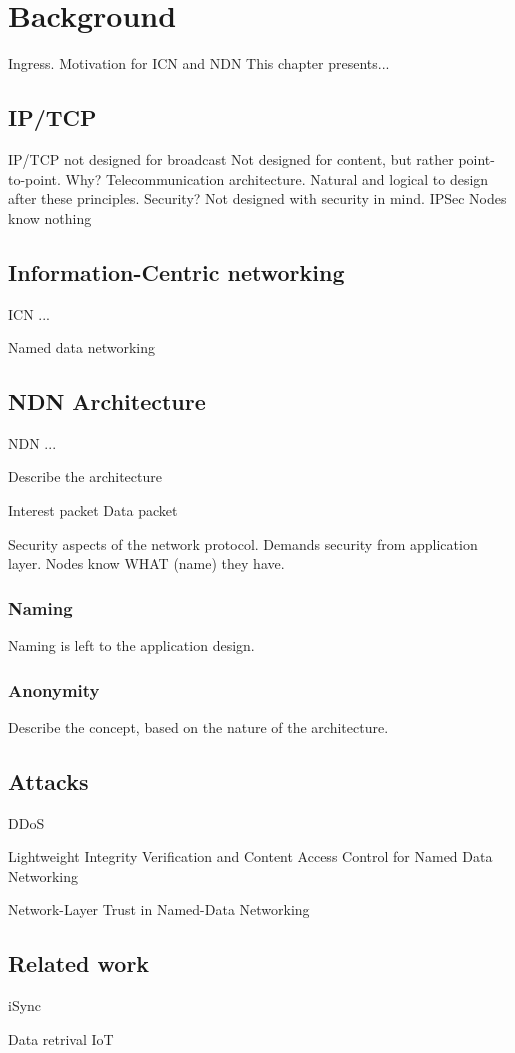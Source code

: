 \chapter{Background}\label{chp:background} 
Ingress. 
Motivation for ICN and NDN
This chapter presents...

\section{IP/TCP}
IP/TCP not designed for broadcast
Not designed for content, but rather point-to-point. 
Why? Telecommunication architecture. 
Natural and logical to design after these principles.
Security? Not designed with security in mind. IPSec
Nodes know nothing

\section{Information-Centric networking}\label{chp2:sec:icn}
\gls{ICN} ...


Named data networking~\cite{DBLP:journals/ccr/0001ABJcCPWZ14}

\section{NDN Architecture}\label{chp2:sec:ndn_architecture}
\gls{NDN} ...

Describe the architecture ~\cite{NDN-0021}

Interest packet
Data packet

Security aspects of the network protocol. Demands security from application layer.
Nodes know WHAT (name) they have. 

\subsection{Naming}
Naming is left to the application design.

\subsection{Anonymity}
Describe the concept, based on the nature of the architecture.

\section{Attacks}
DDoS~\cite{DBLP:conf/icccn/GastiTU013}

Lightweight Integrity Verification and Content Access Control for Named Data Networking~\cite{DBLP:journals/tifs/LiZZSF15}

Network-Layer Trust in Named-Data Networking~\cite{DBLP:journals/ccr/GhaliTU14}

\section{Related work}
iSync~\cite{DBLP:conf/acmicn/FuAC14}

Data retrival IoT~\cite{DBLP:conf/acmicn/AmadeoCM14}